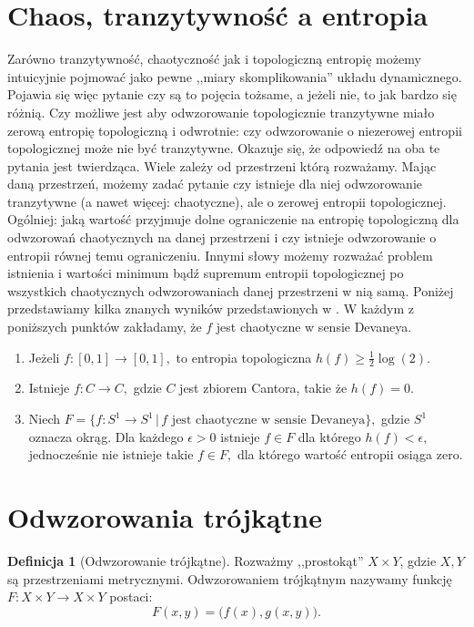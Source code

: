 \documentclass[licencjacka]{pwr_wmat_praca_dyplomowa}
\theoremstyle{plain}
\numberwithin{theorem}{chapter}
\theoremstyle{definition}
\numberwithin{theorem}{chapter}
\newtheorem{definition}[theorem]{Definicja}
\begin{document}
\section{Chaos, tranzytywność a entropia}

Zarówno tranzytywność, chaotyczność jak i topologiczną entropię możemy intuicyjnie pojmować jako pewne ,,miary skomplikowania'' układu dynamicznego. Pojawia się więc pytanie czy są to pojęcia tożsame, a jeżeli nie, to jak bardzo się różnią. Czy możliwe jest aby odwzorowanie topologicznie tranzytywne miało zerową entropię topologiczną i odwrotnie: czy odwzorowanie o niezerowej entropii topologicznej może nie być tranzytywne. Okazuje się, że odpowiedź na oba te pytania jest twierdząca. Wiele zależy od przestrzeni którą rozważamy.
Mając daną przestrzeń, możemy zadać pytanie czy istnieje dla niej odwzorowanie tranzytywne (a nawet więcej: chaotyczne), ale o zerowej entropii topologicznej. Ogólniej: jaką wartość przyjmuje dolne ograniczenie na entropię topologiczną dla odwzorowań chaotycznych na danej przestrzeni i czy istnieje odwzorowanie o entropii równej temu ograniczeniu. Innymi słowy możemy rozważać problem istnienia i wartości minimum bądź supremum entropii topologicznej po wszystkich chaotycznych odwzorowaniach danej przestrzeni w nią samą. Poniżej przedstawiamy kilka znanych wyników przedstawionych w \cite{balibrea2003topological}.
W każdym z poniższych punktów zakładamy, że $f$ jest chaotyczne w sensie Devaneya.
\begin{enumerate}
\item Jeżeli $f: [0,1] \rightarrow [0,1],$ to entropia topologiczna $h(f) \geq \frac{1}{2} \log(2)$.
\item Istnieje $f: C \rightarrow C,$ gdzie $C$ jest zbiorem Cantora, takie że $h(f) = 0.$
\item Niech $F = \{f : S^1 \rightarrow S^1 \, | \, f \textrm{ jest chaotyczne w sensie Devaneya}\},$ gdzie $S^1$ oznacza okrąg. Dla każdego $\epsilon > 0$ istnieje $f \in F$ dla którego $h(f) < \epsilon,$ jednocześnie nie istnieje takie $f \in F,$ dla którego wartość entropii osiąga zero.
\end{enumerate}



\section{Odwzorowania trójkątne}


\begin{definition}[Odwzorowanie trójkątne]
Rozważmy ,,prostokąt'' $X \times Y$, gdzie $X, Y$ są przestrzeniami metrycznymi. 
Odwzorowaniem trójkątnym nazywamy funkcję $F: X \times Y \rightarrow X \times Y$ postaci:
$$F(x,y) = \big(f(x), g(x,y)\big).$$
\end{definition}
\end{document}

